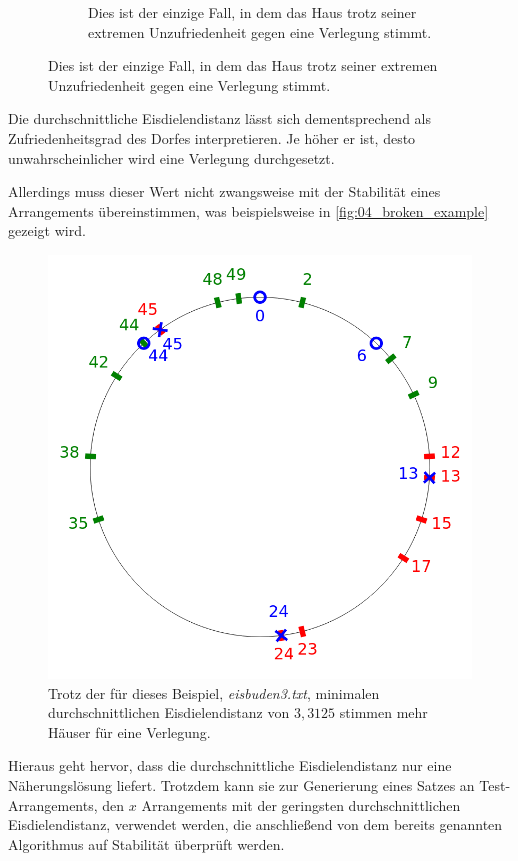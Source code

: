 \documentclass[a4paper,10pt,ngerman,captions=figureheading]{scrartcl}
\newcommand{\imageWidth}{0.3\linewidth}
\begin{document}
\begin{figure}[h!t]
\begin{subfigure}[t]{\imageWidth}
        \caption{Dies ist der einzige Fall, in dem das Haus trotz seiner extremen Unzufriedenheit gegen eine Verlegung stimmt.}
        \label{fig:03_slightly_happy_house}
    \end{subfigure}
\end{figure}

Die durchschnittliche Eisdielendistanz lässt sich dementsprechend als \glqq Zufriedenheitsgrad\grqq{} des Dorfes interpretieren.
Je höher er ist, desto unwahrscheinlicher wird eine Verlegung durchgesetzt.

Allerdings muss dieser Wert nicht zwangsweise mit der Stabilität eines Arrangements übereinstimmen, was beispielsweise in \autoref{fig:04_broken_example} gezeigt wird.

\begin{figure}[h!t]
    \centering
    \caption{Trotz der für dieses Beispiel, \textit{eisbuden3.txt}, minimalen durchschnittlichen Eisdielendistanz von $3,3125$ stimmen mehr Häuser für eine Verlegung.}
    \label{fig:04_broken_example}
    \includegraphics[width=\imageWidth]{04_broken_example.png}
\end{figure}

Hieraus geht hervor, dass die durchschnittliche Eisdielendistanz nur eine Näherungslösung liefert.
Trotzdem kann sie zur Generierung eines Satzes an Test-Arrangements, den $x$ Arrangements mit der geringsten durchschnittlichen Eisdielendistanz, verwendet werden, die anschließend von dem bereits genannten Algorithmus auf Stabilität überprüft werden.
\end{document}
